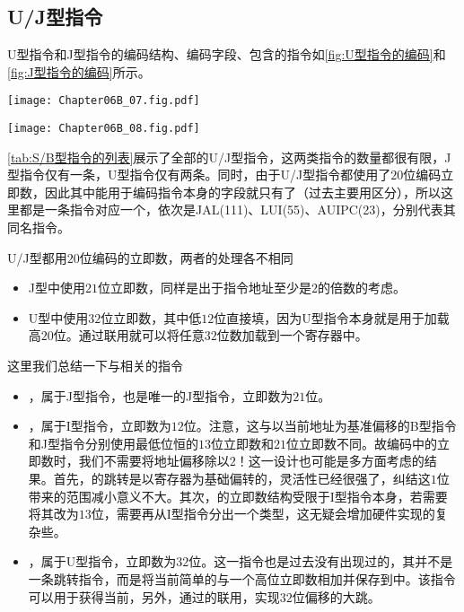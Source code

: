 \subsection{U/J型指令}

U型指令和J型指令的编码结构、编码字段、包含的指令如\cref{fig:U型指令的编码}和\cref{fig:J型指令的编码}所示。
\begin{Figure}[J型指令的编码]
    \texttt{[image: Chapter06B\_07.fig.pdf]}
\end{Figure}

\begin{Figure}[U型指令的编码]
    \texttt{[image: Chapter06B\_08.fig.pdf]}
\end{Figure}

\cref{tab:S/B型指令的列表}展示了全部的U/J型指令，这两类指令的数量都很有限，J型指令仅有一条，U型指令仅有两条。同时，由于U/J型指令都使用了$20$位编码立即数，因此其中能用于编码指令本身的字段就只有了（过去主要用区分），所以这里都是一条指令对应一个，依次是JAL(111)、LUI(55)、AUIPC(23)，分别代表其同名指令。

U/J型都用$20$位编码的立即数，两者的处理各不相同
\begin{itemize}
    \item J型中使用$21$位立即数，同样是出于指令地址至少是$2$的倍数的考虑。
    \item U型中使用$32$位立即数，其中低$12$位直接填，因为U型指令本身就是用于加载高$20$位。通过联用就可以将任意$32$位数加载到一个寄存器中。
\end{itemize}

这里我们总结一下与相关的指令
\begin{itemize}
    \item {}，属于J型指令，也是唯一的J型指令，立即数为$21$位。
    \item {}，属于I型指令，立即数为$12$位。注意，这与以当前地址为基准偏移的B型指令和J型指令分别使用最低位恒的$13$位立即数和$21$位立即数不同。故编码中的立即数时，我们不需要将地址偏移除以$2$！这一设计也可能是多方面考虑的结果。首先，的跳转是以寄存器为基础偏转的，灵活性已经很强了，纠结这$1$位带来的范围减小意义不大。其次，的立即数结构受限于I型指令本身，若需要将其改为$13$位，需要再从I型指令分出一个类型，这无疑会增加硬件实现的复杂些。
    \item {}，属于U型指令，立即数为$32$位。这一指令也是过去没有出现过的，其并不是一条跳转指令，而是将当前简单的与一个高位立即数相加并保存到中。该指令可以用于获得当前，另外，通过的联用，实现$32$位偏移的大跳。
\end{itemize}


